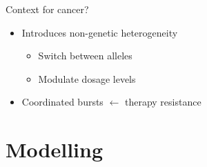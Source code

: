 \documentclass[aspectratio=169,9pt]{beamer}
\begin{document}
\begin{frame}{Context for cancer?}
  \begin{itemize}
    \item Introduces non-genetic heterogeneity
    \begin{itemize}
      \item Switch between alleles 
      \item Modulate dosage levels
    \end{itemize}
    \item \pause Coordinated bursts $\leftarrow$ therapy resistance \parencite{Schuh2020}
  \end{itemize}
\end{frame}

\section{Modelling}
\end{document}
